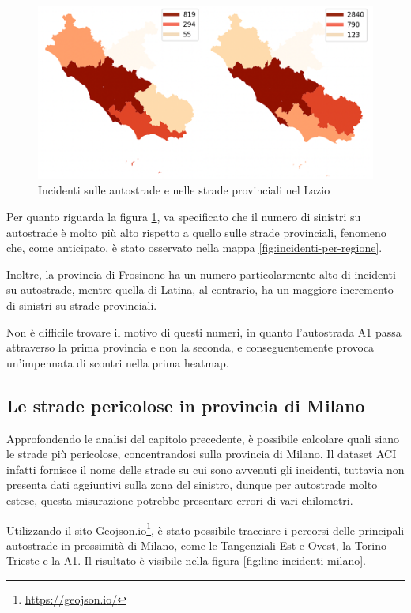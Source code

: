 \documentclass[a4paper,12pt]{report}
\begin{document}
\begin{figure}
    \includegraphics[width=\linewidth]{img_unite/lazio_autostrade_provinciali.png}
    \caption{Incidenti sulle autostrade e nelle strade provinciali nel Lazio}
    \label{fig:lazio-strade}
\end{figure}

Per quanto riguarda la figura \ref{fig:lazio-strade}, va 
specificato che il numero di sinistri su autostrade è molto più alto rispetto 
a quello sulle strade provinciali, fenomeno che, come anticipato, è stato osservato 
nella mappa \ref{fig:incidenti-per-regione}. 

Inoltre, la provincia di Frosinone ha un numero particolarmente alto di incidenti su 
autostrade, mentre quella di Latina, al contrario, ha un maggiore incremento di 
sinistri su strade provinciali. 

Non è difficile trovare il motivo di questi numeri, in quanto l'autostrada A1 passa 
attraverso la prima provincia e non la seconda, e conseguentemente provoca 
un'impennata di scontri nella prima heatmap. 

\subsection{Le strade pericolose in provincia di Milano}

Approfondendo le analisi del capitolo precedente, è possibile calcolare quali siano 
le strade più pericolose, concentrandosi sulla provincia di Milano. 
Il dataset ACI infatti fornisce il nome delle strade su cui sono avvenuti gli incidenti, 
tuttavia non presenta dati aggiuntivi sulla zona del sinistro, dunque per autostrade molto 
estese, questa misurazione potrebbe presentare errori di vari chilometri. 

Utilizzando il sito Geojson.io\footnote{\url{https://geojson.io/}}, 
è stato possibile tracciare i percorsi delle principali autostrade in prossimità di 
Milano, come le Tangenziali Est e Ovest, la Torino-Trieste e la A1. 
Il risultato è visibile nella figura \ref{fig:line-incidenti-milano}. 
\end{document}
